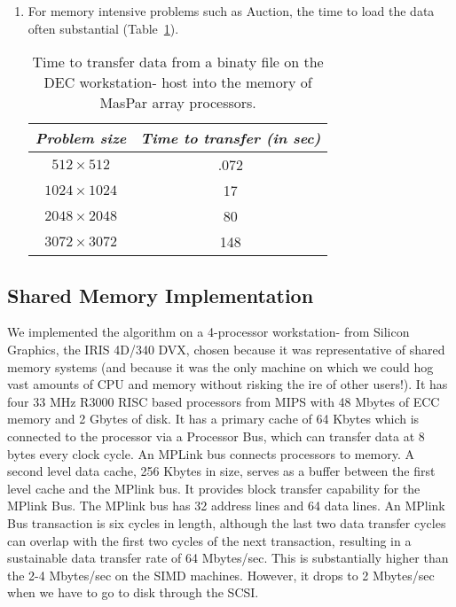 \begin{enumerate}
\item For memory intensive problems such as 
Auction, the time to load the data often substantial
(Table~\ref{simd_read_data}).

\begin{table}[hbt]
\begin{center}
\begin{tabular}{|c|c|} \hline \hline
{\em Problem size} & {\em Time to transfer (in sec) } \\ \hline
$512 \times 512$ & .072 \\ \hline
$1024 \times 1024$ & 17 \\ \hline
$2048 \times 2048$ & 80 \\ \hline
$3072 \times 3072$ & 148 \\ \hline \hline
\end{tabular}
\end{center}
\caption{Time to transfer data from a binaty file on the DEC workstation- host into the memory of MasPar array processors.}
\label{simd_read_data}
\end{table}
\end{enumerate}

\subsection{Shared Memory Implementation}
\label{shmem}

We implemented the algorithm on a 4-processor workstation- from
Silicon Graphics, the IRIS 4D/340 DVX,
chosen because it was representative of 
shared memory systems (and because it was the only
machine on which we could hog vast amounts of CPU and memory without
risking the ire of other users!).
It has four 33 MHz R3000 RISC based processors from MIPS with 48 Mbytes of
ECC memory and 2 Gbytes of disk. It has a primary cache of 64 Kbytes
which is connected to the processor via a Processor Bus, which can transfer
data at 8 bytes every clock cycle. 
An MPLink bus connects processors to memory. 
A second level data cache, 256 Kbytes
in size, serves as a buffer between the first level cache and the MPlink bus.
It provides block transfer capability for the MPlink Bus. 
The MPlink bus has 32 address lines and 64 data lines.
An MPlink Bus transaction is six cycles in length, although the last
two data transfer cycles can overlap with the first two cycles of the
next transaction, resulting in a sustainable data transfer rate 
of 64 Mbytes/sec. This is substantially higher than the 
2-4 Mbytes/sec on the SIMD machines. However, it drops to 2 Mbytes/sec
when we have to go to disk through the SCSI.


